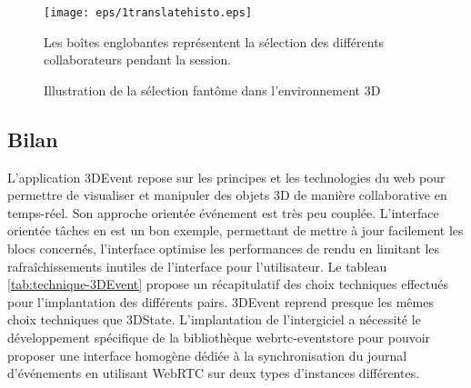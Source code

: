 \begin{figure}[ht]
	\centering
	\texttt{[image: eps/1translatehisto.eps]}
	\caption{Illustration de la sélection fantôme dans l'environnement 3D}{
		Les boîtes englobantes représentent la sélection des différents 
		collaborateurs pendant la session.
	}
	\label{fig:ghostselection}
\end{figure}

\subsection{Bilan}

L'application 3DEvent repose sur les principes et les 
technologies du web pour permettre de visualiser et manipuler des objets \gls{3D} 
de manière collaborative en temps-réel. Son approche orientée événement est très 
peu couplée. L'interface orientée tâches en est un bon exemple, permettant de 
mettre à jour facilement les blocs concernés, l'interface optimise les performances 
de rendu en limitant les rafraîchissements inutiles de l'interface pour l'utilisateur.
Le tableau \ref{tab:technique-3DEvent} propose un récapitulatif des choix 
techniques effectués pour l'implantation des différents pairs. 3DEvent reprend 
presque les mêmes choix techniques que 3DState. L'implantation de 
l'intergiciel a nécessité le développement spécifique de la bibliothèque 
webrtc-eventstore pour pouvoir proposer une interface homogène dédiée à la 
synchronisation du journal d'événements en utilisant WebRTC sur deux types 
d'instances différentes. 

